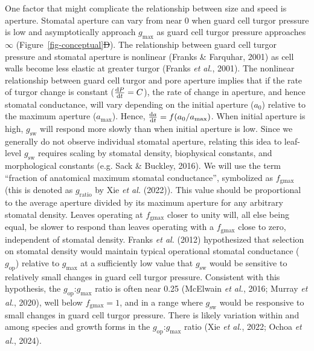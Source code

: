 \documentclass[
  letterpaper,
  DIV=11,
  numbers=noendperiod]{scrartcl}
\newcommand{\fgmax}{$f_\mathrm{gmax}$}
\newcommand{\gmax}{$g_\mathrm{max}$}
\newcommand{\gop}{$g_\mathrm{op}$}
\newcommand{\gsw}{$g_\mathrm{sw}$}
\providecommand{\DIFaddtex}[1]{{\protect\color{blue}\uwave{#1}}} %
\providecommand{\DIFdeltex}[1]{{\protect\color{red}\sout{#1}}}                      %
\providecommand{\DIFaddbegin}{} %
\providecommand{\DIFaddend}{} %
\providecommand{\DIFdelbegin}{} %
\providecommand{\DIFdelend}{} %
\providecommand{\DIFadd}[1]{\texorpdfstring{\DIFaddtex{#1}}{#1}} %
\providecommand{\DIFdel}[1]{\texorpdfstring{\DIFdeltex{#1}}{}} %
\newcommand{\DIFscaledelfig}{0.5}
\newlength{\DIFdelgraphicswidth} %
\newlength{\DIFdelgraphicsheight} %
\newcommand{\DIFaddincludegraphics}[2][]{{\color{blue}\fbox{\DIFOincludegraphics[#1]{#2}}}} %
\newcommand{\DIFdelincludegraphics}[2][]{%
\sbox{\DIFdelgraphicsbox}{\DIFOincludegraphics[#1]{#2}}%
\settoboxwidth{\DIFdelgraphicswidth}{\DIFdelgraphicsbox} %
\settoboxtotalheight{\DIFdelgraphicsheight}{\DIFdelgraphicsbox} %
\scalebox{\DIFscaledelfig}{%
\parbox[b]{\DIFdelgraphicswidth}{\usebox{\DIFdelgraphicsbox}\\[-\baselineskip] \rule{\DIFdelgraphicswidth}{0em}}\llap{\resizebox{\DIFdelgraphicswidth}{\DIFdelgraphicsheight}{%
\setlength{\unitlength}{\DIFdelgraphicswidth}%
\begin{picture}(1,1)%
\thicklines\linethickness{2pt} %
{\color[rgb]{1,0,0}\put(0,0){\framebox(1,1){}}}%
{\color[rgb]{1,0,0}\put(0,0){\line( 1,1){1}}}%
{\color[rgb]{1,0,0}\put(0,1){\line(1,-1){1}}}%
\end{picture}%
}\hspace*{3pt}}} %
} %
\DeclareRobustCommand{\DIFaddbegin}{\DIFOaddbegin \let\includegraphics\DIFaddincludegraphics} %
\DeclareRobustCommand{\DIFaddend}{\DIFOaddend \let\includegraphics\DIFOincludegraphics} %
\DeclareRobustCommand{\DIFdelbegin}{\DIFOdelbegin \let\includegraphics\DIFdelincludegraphics} %
\DeclareRobustCommand{\DIFdelend}{\DIFOaddend \let\includegraphics\DIFOincludegraphics} %
\begin{document}
One factor that might complicate the relationship between size and speed
is aperture. Stomatal aperture can vary from near 0 when guard cell
turgor pressure is low and asymptotically approach \gmax{} as guard cell
turgor pressure approaches \(\infty\) (Figure~\ref{fig-conceptual}\DIFdelbegin \DIFdel{D}\DIFdelend \DIFaddbegin \DIFadd{d}\DIFaddend ).
The relationship between guard cell turgor pressure and stomatal
aperture is nonlinear (Franks \& Farquhar, 2001) as cell walls become
less elastic at greater turgor (Franks \emph{et al.}, 2001). The
nonlinear relationship between guard cell turgor and pore aperture
implies that if the rate of turgor change is constant
(\(\dv{P}{t} = C\)), the rate of change in aperture, and hence stomatal
conductance, will vary depending on the initial aperture (\(a_0\))
relative to the maximum aperture (\(a_\mathrm{max}\)). Hence,
\(\dv{a}{t} = f(a_0 / a_\mathrm{max})\). When initial aperture is high,
\gsw{} will respond more slowly than when initial aperture is low. Since
we generally do not observe individual stomatal aperture, relating this
idea to leaf-level \gsw{} requires scaling by stomatal density,
biophysical constants, and morphological constants (e.g. Sack \&
Buckley, 2016). We will use the term ``fraction of anatomical maximum
stomatal conductance'', symbolized as \fgmax{} (this is denoted as
\(g_\mathrm{ratio}\) by Xie \emph{et al.} (2022)). This value should be
proportional to the average aperture divided by its maximum aperture for
any arbitrary stomatal density. Leaves operating at \fgmax{} closer to
unity will, all else being equal, be slower to respond than leaves
operating with a \fgmax{} close to zero, independent of stomatal
density. Franks \emph{et al.} (2012) hypothesized that selection on
stomatal density would maintain typical operational stomatal conductance
(\gop) relative to \gmax{} at a sufficiently low value that \gsw{} would
be sensitive to relatively small changes in guard cell turgor pressure.
Consistent with this hypothesis, the \gop:\gmax{} ratio is often near
0.25 (McElwain \emph{et al.}, 2016; Murray \emph{et al.}, 2020), well
below \(f_\mathrm{gmax} = 1\), and in a range where \gsw{} would be
responsive to small changes in guard cell turgor pressure. There is
likely variation within and among species and growth forms in the
\gop:\gmax{} ratio (Xie \emph{et al.}, 2022; Ochoa \emph{et al.}, 2024).
\end{document}
